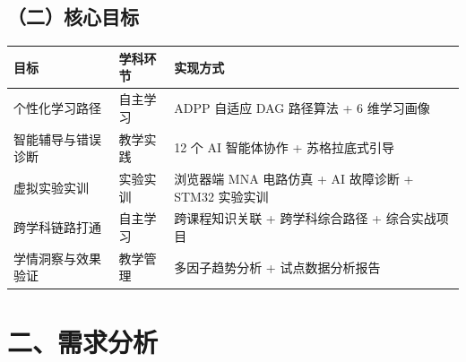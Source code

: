 \documentclass[zihao=-4,a4paper,UTF8,fontset=windows]{ctexart}
\begin{document}
\par\noindent\begin{minipage}{\linewidth}
\subsection{（二）核心目标}
\par\noindent\begin{tabular}{|p{3.0cm}|p{4.5cm}|p{6.2cm}|}
\hline
\textbf{目标} & \textbf{学科环节} & \textbf{实现方式} \\ \hline
个性化学习路径 & 自主学习 & ADPP 自适应 DAG 路径算法 + 6 维学习画像 \\ \hline
智能辅导与错误诊断 & 教学实践 & 12 个 AI 智能体协作 + 苏格拉底式引导 \\ \hline
虚拟实验实训 & 实验实训 & 浏览器端 MNA 电路仿真 + AI 故障诊断 + STM32 实验实训 \\ \hline
跨学科链路打通 & 自主学习 & 跨课程知识关联 + 跨学科综合路径 + 综合实战项目 \\ \hline
学情洞察与效果验证 & 教学管理 & 多因子趋势分析 + 试点数据分析报告 \\ \hline
\end{tabular}\par
\end{minipage}\par
\section{二、需求分析}
\end{document}

